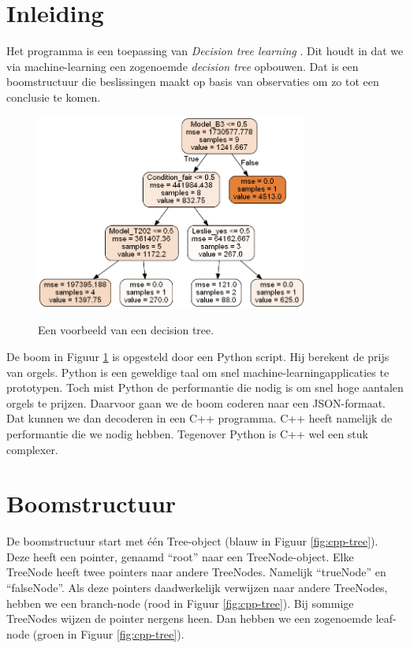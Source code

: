 \section{Inleiding}
Het programma is een toepassing van \textit{Decision tree learning} \cite{wiki:dtl}. Dit houdt in dat we via machine-learning een zogenoemde \textit{decision tree} opbouwen. Dat is een boomstructuur die beslissingen maakt op basis van observaties om zo tot een conclusie te komen.

\begin{figure}[ht]
    \centering
    \includegraphics[width=0.8\textwidth]{illustraties/tree}
    \caption{Een voorbeeld van een decision tree.}
    \cite{git:github}
    \label{fig:tree}
\end{figure}

De boom in Figuur \ref{fig:tree} is opgesteld door een Python script. Hij berekent de prijs van orgels. Python is een geweldige taal om snel machine-learningapplicaties te prototypen. Toch mist Python de performantie die nodig is om snel hoge aantalen orgels te prijzen. Daarvoor gaan we de boom coderen naar een JSON-formaat. Dat kunnen we dan decoderen in een C++ programma. C++ heeft namelijk de performantie die we nodig hebben. Tegenover Python is C++ wel een stuk complexer.

\clearpage

\section{Boomstructuur}
De boomstructuur start met één Tree-object (blauw in Figuur \ref{fig:cpp-tree}). Deze heeft een pointer, genaamd ``root'' naar een TreeNode-object. Elke TreeNode heeft twee pointers naar andere TreeNodes. Namelijk ``trueNode'' en ``falseNode''. Als deze pointers daadwerkelijk verwijzen naar andere TreeNodes, hebben we een branch-node (rood in Figuur \ref{fig:cpp-tree}). Bij sommige TreeNodes wijzen de pointer nergens heen. Dan hebben we een zogenoemde leaf-node (groen in Figuur \ref{fig:cpp-tree}).

